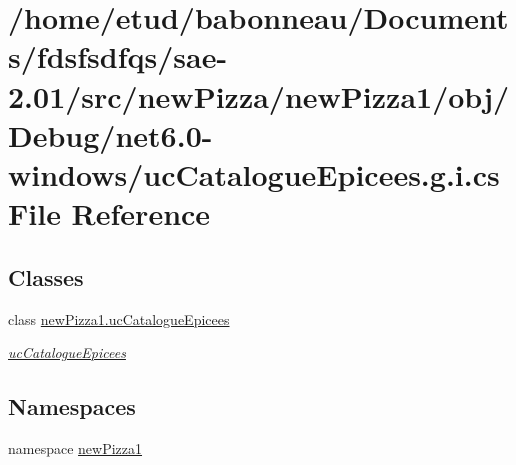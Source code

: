 \hypertarget{net6_80-windows_2ucCatalogueEpicees_8g_8i_8cs}{}\section{/home/etud/babonneau/\+Documents/fdsfsdfqs/sae-\/2.01/src/new\+Pizza/new\+Pizza1/obj/\+Debug/net6.0-\/windows/uc\+Catalogue\+Epicees.g.\+i.\+cs File Reference}
\label{net6_80-windows_2ucCatalogueEpicees_8g_8i_8cs}
\subsection*{Classes}
\begin{DoxyCompactItemize}
\item 
class \hyperlink{classnewPizza1_1_1ucCatalogueEpicees}{new\+Pizza1.\+uc\+Catalogue\+Epicees}
\begin{DoxyCompactList}\small\item\em \hyperlink{classnewPizza1_1_1ucCatalogueEpicees}{uc\+Catalogue\+Epicees} \end{DoxyCompactList}\end{DoxyCompactItemize}
\subsection*{Namespaces}
\begin{DoxyCompactItemize}
\item 
namespace \hyperlink{namespacenewPizza1}{new\+Pizza1}
\end{DoxyCompactItemize}
